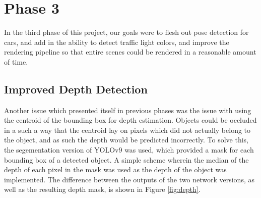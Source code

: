 \section{Phase 3}
In the third phase of this project, our goals were to flesh out pose detection for cars, and add in the ability to detect traffic light colors, and improve the rendering pipeline so that entire scenes could be rendered in a reasonable amount of time.

\subsection{Improved Depth Detection}
Another issue which presented itself in previous phases was the issue with using the centroid of the bounding box for depth estimation. Objects could be occluded in a such a way that the centroid lay on pixels which did not actually belong to the object, and as such the depth would be predicted incorrectly. To solve this, the segementation version of YOLOv9 was used, which provided a mask for each bounding box of a detected object. A simple scheme wherein the median of the depth of each pixel in the mask was used as the depth of the object was implemented. The difference between the outputs of the two network versions, as well as the resulting depth mask, is shown in Figure \ref{fig:depth}.

